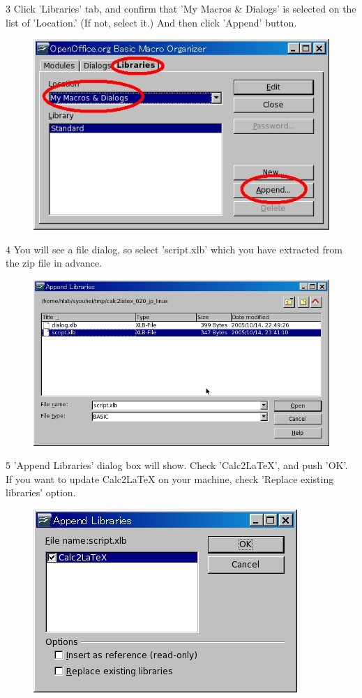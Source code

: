 3 Click 'Libraries' tab, and confirm that 'My Macros \& Dialogs' is selected on the list of 'Location.' (If not, select it.) And then click 'Append' button.
\begin{figure}[h]
\centering
\includegraphics[scale=0.4]{figs/step3_oo20}
\end{figure}

4 You will see a file dialog, so select 'script.xlb' which you have extracted from the zip file in advance.
\begin{figure}[h]
\centering
\includegraphics[scale=0.4]{figs/step4_oo20}
\end{figure}

5 'Append Libraries' dialog box will show. Check 'Calc2LaTeX', and push 'OK'.
If you want to update Calc2LaTeX on your machine, check 'Replace existing libraries' option.
\begin{figure}[h]
\centering
\includegraphics[scale=0.4]{figs/step5_oo20}
\end{figure}

